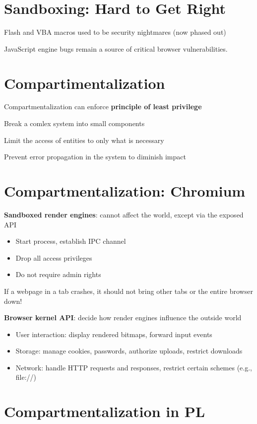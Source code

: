 \documentclass[11pt]{article}
\begin{document}
\section*{Sandboxing: Hard to Get Right}

Flash and VBA macros used to be security nightmares (now phased out)

JavaScript engine bugs remain a source of critical browser vulnerabilities.

\section*{Compartimentalization}

Compartmentalization can enforce \textbf{principle of least privilege}

Break a comlex system into small components

Limit the access of entities to only what is necessary

Prevent error propagation in the system to diminish impact

\section*{Compartmentalization: Chromium}

\textbf{Sandboxed render engines}: cannot affect the world, except via the exposed API
\begin{itemize}
	\item Start process, establish IPC channel
	\item Drop all access privileges
	\item Do not require admin rights
\end{itemize}

If a webpage in a tab crashes, it should not bring other tabs or the entire browser down!

\textbf{Browser kernel API}: decide how render engines influence the outside world

\begin{itemize}
	\item User interaction: display rendered bitmaps, forward input events
	\item Storage: manage cookies, passwords, authorize uploads, restrict downloads
	\item Network: handle HTTP requests and responses, restrict certain schemes (e.g., file://) 
\end{itemize}

\section*{Compartmentalization in PL}
\end{document}
